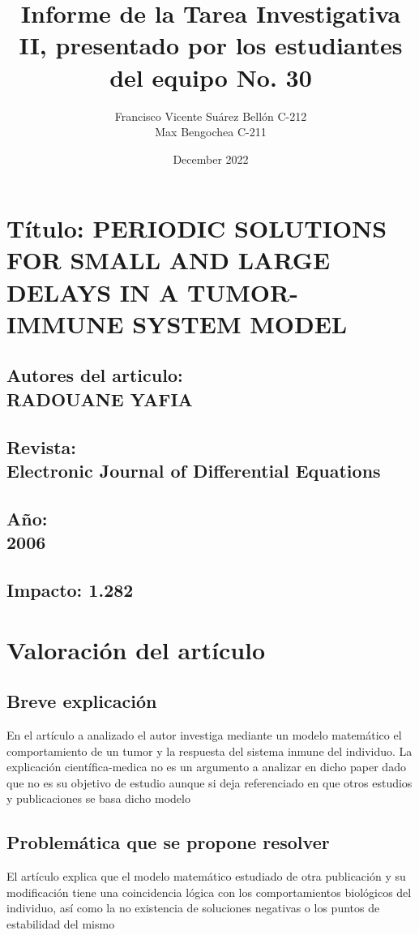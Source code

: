 \documentclass{article}
\title{Informe de la Tarea Investigativa II, presentado por los
estudiantes del equipo No. 30}
\author{Francisco Vicente Suárez Bellón C-212 \\
  Max Bengochea C-211}
\date{December 2022}
\begin{document}
\maketitle
\section*{Título: PERIODIC SOLUTIONS FOR SMALL AND LARGE DELAYS IN
A TUMOR-IMMUNE SYSTEM MODEL}
\subsection*{\centering Autores del articulo:\\
                 RADOUANE YAFIA
             }
\subsection*{\centering Revista: \\ 
                Electronic Journal of Differential Equations
             }
\subsection*{\centering Año: \\ 
                2006
             }
\subsection*{\centering Impacto: 1.282 }


\section{Valoración del artículo}
  \subsection*{Breve explicación}
  \noindent
   En el artículo a analizado el autor investiga mediante un modelo matemático el comportamiento 
   de un tumor y la respuesta del sistema inmune del individuo. La explicación científica-medica
   no es un argumento a analizar en dicho paper dado que no es su objetivo de estudio aunque si
   deja referenciado en que otros estudios y publicaciones se basa dicho modelo
   \subsection*{Problemática que se propone resolver
   }
   El artículo explica que el modelo matemático estudiado de otra publicación y su modificación 
   tiene una coincidencia lógica con los comportamientos biológicos del individuo, así como la no existencia
   de soluciones negativas o los puntos de estabilidad del mismo 
\end{document}
